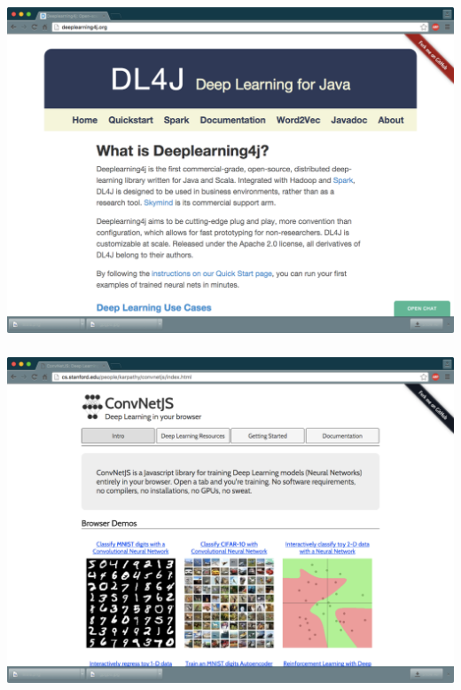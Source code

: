 \documentclass[xetex,mathserif,serif,aspectratio=169]{beamer}
\begin{document}
\begin{frame}[fragile] \frametitle{} \oldB \small

\includegraphics[width=\textwidth]{img/deeplearning.pdf}

\end{frame}

\begin{frame}[fragile] \frametitle{} \oldB \small

\includegraphics[width=\textwidth]{img/convnetjs.pdf}

\end{frame}
\end{document}
